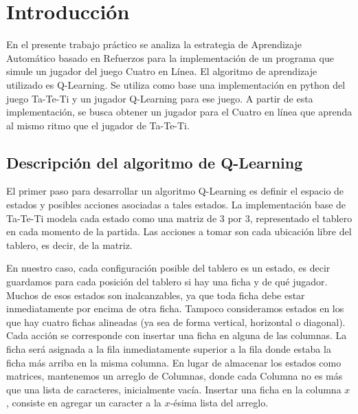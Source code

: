 \documentclass[10pt, a4paper]{article}
\begin{document}
\fecha{\today}


\maketitle
\tableofcontents
\newpage


\section{Introducción}


En el presente trabajo práctico se analiza la estrategia de Aprendizaje Automático basado en Refuerzos para la implementación de un programa que simule un jugador del juego Cuatro en Línea. El algoritmo de aprendizaje utilizado es Q-Learning. Se utiliza como base una implementación en python del juego Ta-Te-Ti y un jugador Q-Learning para ese juego. A partir de esta implementación, se busca obtener un jugador para el Cuatro en línea que aprenda al mismo ritmo que el jugador de Ta-Te-Ti.


\subsection{Descripción del algoritmo de Q-Learning}


El primer paso para desarrollar un algoritmo Q-Learning es definir el espacio de estados y posibles acciones asociadas a tales estados. La implementación base de Ta-Te-Ti modela cada estado como una matriz de 3 por 3, representado el tablero en cada momento de la partida. Las acciones a tomar son cada ubicación libre del tablero, es decir, de la matriz.


En nuestro caso, cada configuración posible del tablero es un estado, es decir guardamos para cada posición del tablero si hay una ficha y de qué jugador. Muchos de esos estados son inalcanzables, ya que toda ficha debe estar inmediatamente por encima de otra ficha. Tampoco consideramos estados en los que hay cuatro fichas alineadas (ya sea de forma vertical, horizontal o diagonal). 
Cada acción se corresponde con insertar una ficha en alguna de las columnas. La ficha será asignada a la fila inmediatamente superior a la fila donde estaba la ficha más arriba en la misma columna. En lugar de almacenar los estados como matrices, mantenemos un arreglo de Columnas, donde cada Columna no es más que una lista de caracteres, inicialmente vacía. Insertar una ficha en la columna $x$, consiste en agregar un caracter a la $x$-ésima lista del arreglo.
\end{document}
